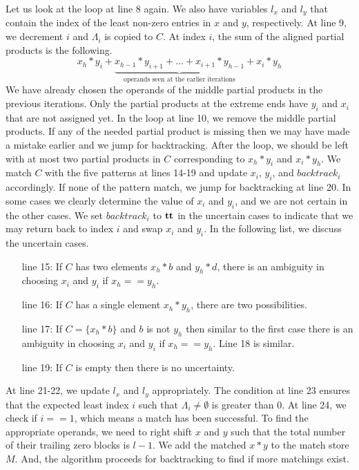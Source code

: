 Let us look at the loop at line 8 again.
%
We also have variables $l_x$ and $l_y$ that contain the index of
the least non-zero entries in $x$ and $y$, respectively.
%
At line 9, we decrement $i$ and $\Lambda_i$ is copied to $C$.
%
At index $i$, the sum of the aligned partial products is the following.
$$
x_{h}*y_{i} + \underbrace{x_{h-1}*y_{i+1} + \dots + x_{i+1}*y_{h-1}}_{\text{operands seen at the earlier iterations}} + x_{i}*y_{h}
$$
We have already chosen the operands of the middle partial products in
the previous iterations.
%
Only the partial products at the extreme ends have $y_i$ and $x_i$ that are
not assigned yet.
%
In the loop at line 10, we remove the middle partial products.
%
If any of the needed partial product is missing then we may have made a mistake
earlier and we jump for backtracking.
%
After the loop, we should be left with at most two partial products in $C$
corresponding to $x_{h}*y_{i}$ and $x_{i}*y_{h}$.
%
We match $C$ with the five patterns at lines 14-19 and
update $x_i$, $y_i$, and $backtrack_i$ accordingly.
%
If none of the pattern match, we jump for backtracking at line 20.
%
In some cases we clearly determine the value of $x_i$ and $y_i$, and
we are not certain in the other cases.
%
We set $backtrack_i$ to $\mathbf{tt}$ in the uncertain cases to indicate
that we may return back to index $i$ and swap $x_i$ and $y_i$.
%
In the following list, we discuss the uncertain cases.
%
\begin{itemize}
\item[line 15:] If $C$ has two elements $x_h*b$ and $y_h*d$,
there is an ambiguity in choosing $x_i$ and $y_i$
if $x_h == y_h$.
%
\item[line 16:] If $C$ has a single element $x_h*y_h$, there  
are two possibilities.
\item[line 17:] If $C = \{x_h*b\}$ and $b$ is not $y_h$ then 
  similar to the first case there is an ambiguity in
  choosing $x_i$ and $y_i$ if $x_h == y_h$. Line 18 is similar.
\item[line 19:] If $C$ is empty then there is no uncertainty. %
\end{itemize}
%
At line 21-22, we update $l_x$ and $l_y$ appropriately.
%
The condition at line 23 ensures that the expected
least index $i$ such that $\Lambda_i \neq \emptyset$ is greater than 0.    
%
At line 24, we check if $i==1$, which means a match has been successful.
%
To find the appropriate operands, we need to right shift $x$ and $y$
such that the total number of their trailing zero blocks is $l-1$.
%
We add the matched $x*y$ to the match store $M$.
%
And, the algorithm proceeds for backtracking to find if more matchings
exist.

